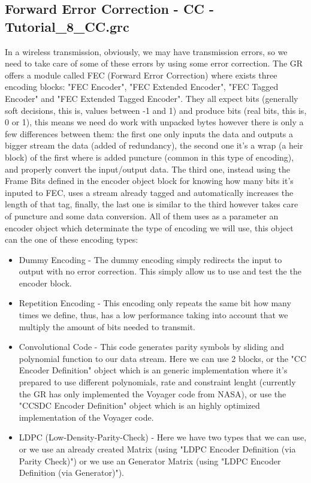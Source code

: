 \documentclass[a4paper, 10pt, conference]{ieeeconf}      %
\begin{document}
\subsection{Forward Error Correction - CC - Tutorial\_8\_CC.grc}
    In a wireless transmission, obviously, we may have transmission errors, so we need to take care of some of these errors by using some error correction. The GR offers a module called FEC (Forward Error Correction) where exists three encoding blocks: "FEC Encoder", "FEC Extended Encoder", "FEC Tagged Encoder" and "FEC Extended Tagged Encoder". They all expect bits (generally soft decisions, this is, values between -1 and 1) and produce bits (real bits, this is, 0 or 1), this means we need do work with unpacked bytes however there is only a few differences between them: the first one only inputs the data and outputs a bigger stream the data (added of redundancy), the second one it's a wrap (a heir block) of the first where is added puncture (common in this type of encoding), and properly convert the input/output data. The third one, instead using the Frame Bits defined in the encoder object block for knowing how many bits it's inputed to FEC, uses a stream already tagged and automatically increases the length of that tag, finally, the last one is similar to the third however takes care of puncture and some data conversion. All of them uses as a parameter an encoder object which determinate the type of encoding we will use, this object can the one of these encoding types:
    \begin{itemize}
        \item Dummy Encoding - The dummy encoding simply redirects the input to output with no error correction. This simply allow us to use and test the the encoder block.
        \item Repetition Encoding - This encoding only repeats the same bit how many times we define, thus, has a low performance taking into account that we multiply the amount of bits needed to transmit.
        \item Convolutional Code - This code generates parity symbols by sliding and polynomial function to our data stream. Here we can use 2 blocks, or the "CC Encoder Definition" object which is an generic implementation where it's prepared to use different polynomials, rate and constraint lenght (currently the GR has only implemented the Voyager code from NASA), or use the "CCSDC Encoder Definition" object which is an highly optimized implementation of the Voyager code.
        \item LDPC (Low-Density-Parity-Check) - Here we have two types that we can use, or we use an already created Matrix (using "LDPC Encoder Definition (via Parity Check)") or we use an Generator Matrix (using "LDPC Encoder Definition (via Generator)").
    \end{itemize}
\end{document}
